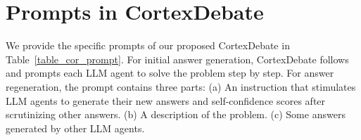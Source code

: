 \section{Prompts in CortexDebate}
\label{appendix_prompt_cortexdebate}



We provide the specific prompts of our proposed CortexDebate in Table~\ref{table_cor_prompt}. For initial answer generation, CortexDebate follows~\cite{kojima2022large} and prompts each LLM agent to solve the problem step by step. For answer regeneration, the prompt contains three parts: (a) An instruction that stimulates LLM agents to generate their new answers and self-confidence scores after scrutinizing other answers. (b) A description of the problem. (c) Some answers generated by other LLM agents.